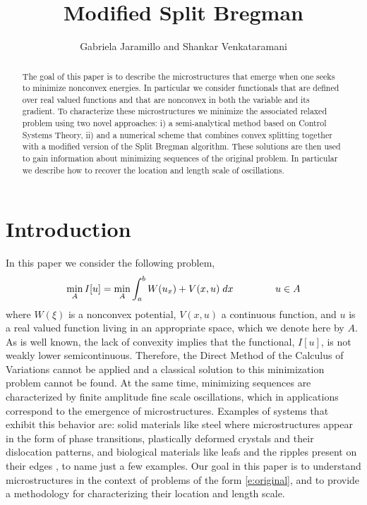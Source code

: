 \documentclass[11pt]{article}
\title{Modified Split Bregman}
\author{Gabriela Jaramillo and Shankar Venkataramani}
\theoremstyle{plain}
\begin{document}
\maketitle

\begin{abstract}
The goal of this paper is to describe the microstructures that emerge when one seeks to minimize nonconvex energies. In particular we consider functionals that are defined over real valued functions and that are nonconvex in both the variable and its gradient. To  characterize these microstructures we minimize the associated relaxed problem using two novel approaches: i) a semi-analytical method based on Control Systems Theory, ii) and a numerical scheme that combines convex splitting together with a modified version of the Split Bregman algorithm. These solutions are then used to gain information about minimizing sequences of the original problem. In particular we describe how to recover the location and length scale of oscillations.
\end{abstract}

\section{Introduction}\label{s:intro}


In this paper we consider the following problem,
\begin{equation}\label{e:original}
 \min_A I[u] = \min_A \int_a^b W(u_x) + V(x,u) \;dx \hspace{1.5cm} u \in A
 \end{equation}
where $W(\xi)$ is a nonconvex potential, $V(x,u)$ a continuous function, and $u$ is a real valued function living in an appropriate space, which we denote here by $A$. As is well known, the lack of convexity implies that the functional, $I[u]$, is not weakly lower semicontinuous. Therefore, the Direct Method of the Calculus of Variations cannot be applied and a classical solution to this minimization problem cannot be found. At the same time, minimizing sequences are characterized by finite amplitude fine scale oscillations, which in applications correspond to the emergence of microstructures. Examples of systems that exhibit this behavior are: solid materials like steel where microstructures appear in the form of phase transitions, plastically deformed crystals and their dislocation patterns, and biological materials like leafs and the ripples present on their edges , to name just a few examples. Our goal in this paper is to understand microstructures in the context of problems of the form \eqref{e:original}, and to provide a methodology for characterizing their location and length scale. 
\end{document}
